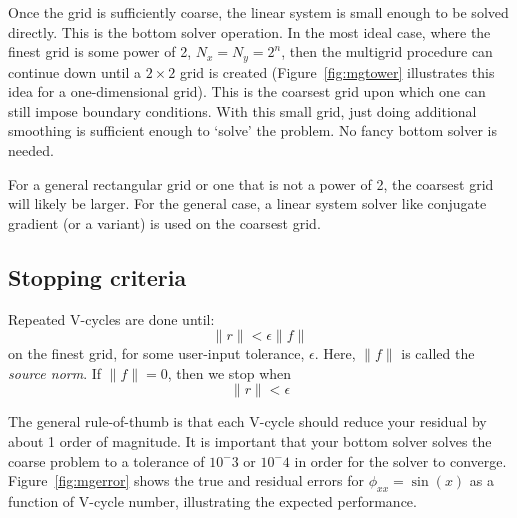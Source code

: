 Once the grid is sufficiently coarse, the linear system is small
enough to be solved directly.  This is the bottom solver operation.
In the most ideal case, where the finest grid is some power of 2, $N_x
= N_y = 2^n$, then the multigrid procedure can continue down until a
$2\times 2$ grid is created (Figure~\ref{fig:mgtower} illustrates this idea
for a one-dimensional grid).  This is the coarsest grid upon which one
can still impose boundary conditions.  With this small grid, just
doing additional smoothing is sufficient enough to `solve' the
problem.  No fancy bottom solver is needed.

For a general rectangular grid or one that is not a power of 2, the
coarsest grid will likely be larger.  For the general case, a linear
system solver like conjugate gradient (or a variant) is used on the
coarsest grid.

\subsection{Stopping criteria}

Repeated V-cycles are done until:
\begin{equation}
\| r \| < \epsilon \|f\|
\end{equation}
on the finest grid, for some user-input tolerance, $\epsilon$.  Here,
$\|f\|$ is called the {\em source norm}.  If $\|f\| = 0$, then we stop
when
\begin{equation}
\| r \| < \epsilon 
\end{equation}


The general rule-of-thumb is that each V-cycle should reduce your
residual by about 1 order of magnitude.  It is important that your
bottom solver solves the coarse problem to a tolerance of $10^-3$ or
$10^-4$ in order for the solver to converge.  Figure~\ref{fig:mgerror}
shows the true and residual errors for $\phi_{xx} = \sin(x)$ as a function
of V-cycle number, illustrating the expected performance.

